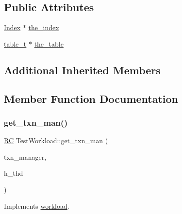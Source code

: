 \subsection*{Public Attributes}
\begin{DoxyCompactItemize}
\item 
\hyperlink{classIndex}{Index} $\ast$ \hyperlink{classTestWorkload_a0625829ac5f20b1d5c18c6923d17ee0c}{the\+\_\+index}
\item 
\hyperlink{classtable__t}{table\+\_\+t} $\ast$ \hyperlink{classTestWorkload_aa98e2cc097d29b701ff914e624fe8d77}{the\+\_\+table}
\end{DoxyCompactItemize}
\subsection*{Additional Inherited Members}


\subsection{Member Function Documentation}
\mbox{\label{classTestWorkload_abc14a45ce19f90979f01cf2e96f1bb9f}} 
\subsubsection{\texorpdfstring{get\+\_\+txn\+\_\+man()}{get\_txn\_man()}}
{\footnotesize\ttfamily \hyperlink{global_8h_a78c49a674c810fdd03d20432f7be864a}{RC} Test\+Workload\+::get\+\_\+txn\+\_\+man (\begin{DoxyParamCaption}\item[{\hyperlink{classtxn__man}{txn\+\_\+man} $\ast$\&}]{txn\+\_\+manager,  }\item[{\hyperlink{classthread__t}{thread\+\_\+t} $\ast$}]{h\+\_\+thd }\end{DoxyParamCaption})\hspace{0.3cm}{\ttfamily [virtual]}}



Implements \hyperlink{classworkload_ac22d0558c3fc549b8b07347cebb95cb3}{workload}.

\mbox{\label{classTestWorkload_aba95b44e0531c1ff81d9846bcd7df8ba}} 
